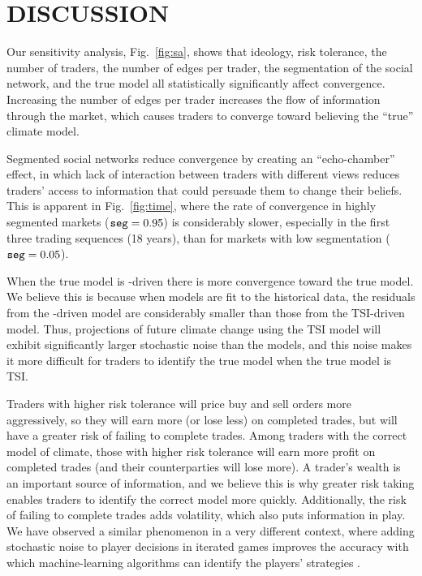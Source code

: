 \documentclass{wscpaperproc}\usepackage[]{graphicx}\usepackage[]{color}
\begin{document}
\section{DISCUSSION}

Our sensitivity analysis, Fig.~\ref{fig:sa}, shows that ideology, risk tolerance, the number of traders, the number of edges per trader, the segmentation of the social network, and the true model all statistically significantly affect convergence.  Increasing the number of edges per trader increases the flow of information through the market, which causes traders to converge toward believing the ``true'' climate model.

Segmented social networks reduce convergence by creating an ``echo-chamber'' effect, in which lack of interaction between traders with different views reduces traders' access to information that could persuade them to change their beliefs. This is apparent in Fig.~\ref{fig:time}, where the rate of convergence in highly segmented markets ($\text{\texttt{seg}} = 0.95$) is considerably slower, especially in the first three trading sequences (18 years), than for markets with low segmentation ($\text{\texttt{seg}} = 0.05$).

When the true model is -driven there is more convergence toward the true model. We believe this is because when models are fit to the historical data, the residuals from the -driven model are considerably smaller than those from the TSI-driven model. Thus, projections of future climate change using the TSI model will exhibit significantly larger stochastic noise than the  models, and this noise makes it more difficult for traders to identify the true model when the true model is TSI.

Traders with higher risk tolerance will price buy and sell orders more aggressively, so they will earn more (or lose less) on completed trades, but will have a greater risk of failing to complete trades. Among traders with the correct model of climate, those with higher risk tolerance  will earn more profit on completed trades (and their counterparties will lose more). A trader's wealth is an important source of information, and we believe this is why greater risk taking enables traders to identify the correct model more quickly. Additionally, the risk of failing to complete trades adds volatility, which also puts information in play. We have observed a similar phenomenon in a very different context, where adding stochastic noise to player decisions in iterated games improves the accuracy with which machine-learning algorithms can identify the players' strategies .
\end{document}
